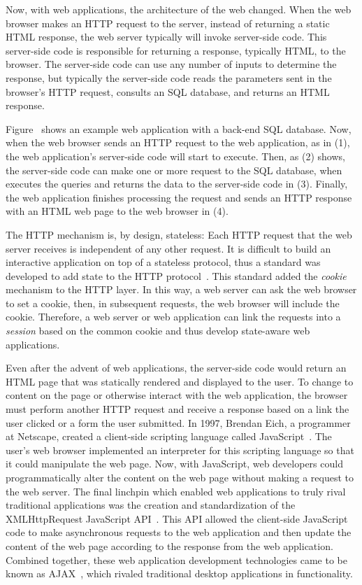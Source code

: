Now, with web applications, the architecture of the web changed. When
the web browser makes an HTTP request to the server, instead of
returning a static HTML response, the web server typically will invoke
server-side code. This server-side code is responsible for returning a
response, typically HTML, to the browser. The server-side code can use
any number of inputs to determine the response, but typically the
server-side code reads the parameters sent in the browser's HTTP
request, consults an SQL database, and returns an HTML response.



Figure~ shows an example web
application with a back-end SQL database. Now, when the web browser
sends an HTTP request to the web application, as in (1), the web
application's server-side code will start to execute. Then, as (2)
shows, the server-side code can make one or more request to the SQL
database, when executes the queries and returns the data to the
server-side code in (3). Finally, the web application finishes
processing the request and sends an HTTP response with an HTML web
page to the web browser in (4).

The HTTP mechanism is, by design, stateless: Each HTTP request that
the web server receives is independent of any other request. It is
difficult to build an interactive application on top of a stateless
protocol, thus a standard was developed to add state to the HTTP
protocol~\cite{kristol97:cookies}. This standard added the
\emph{cookie} mechanism to the HTTP layer. In this way, a web server
can ask the web browser to set a cookie, then, in subsequent requests,
the web browser will include the cookie. Therefore, a web server or
web application can link the requests into a \emph{session} based on
the common cookie and thus develop state-aware web applications.

Even after the advent of web applications, the server-side code would
return an HTML page that was statically rendered and displayed to the
user. To change to content on the page or otherwise interact with the
web application, the browser must perform another HTTP request and
receive a response based on a link the user clicked or a form the user
submitted. In 1997, Brendan Eich, a programmer at Netscape, created a
client-side scripting language called JavaScript~\cite{ecmascript97}.
The user's web browser implemented an interpreter for this scripting
language so that it could manipulate the web page. Now, with
JavaScript, web developers could programmatically alter the content on
the web page without making a request to the web server. The final
linchpin which enabled web applications to truly rival traditional
applications was the creation and standardization of the
XMLHttpRequest JavaScript API~\cite{vankesteren06:xmlhttprequest}.
This API allowed the client-side JavaScript code to make asynchronous
requests to the web application and then update the content of the
web page according to the response from the web application. Combined
together, these web application development technologies came to be
known as AJAX~\cite{garrett05:ajax}, which rivaled traditional desktop
applications in functionality.

